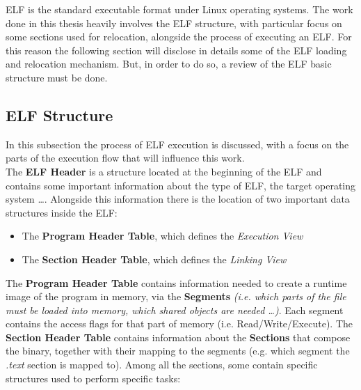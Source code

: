\gls{ELF} is the standard executable format under Linux operating systems.
The work done in this thesis heavily involves the \gls{ELF} structure, with particular focus on some sections 
used for relocation, alongside the process of executing an \gls{ELF}. For this reason the following section will disclose 
in details some of the \gls{ELF} loading and relocation mechanism. But, in order to do so, a review of the \gls{ELF} basic 
structure must be done.
\subsection{ELF Structure}
    In this subsection the process of \gls{ELF} execution is discussed, with a focus on the parts of the execution flow 
    that will influence this work.\\
    The \textbf{ELF Header} is a structure located at the beginning of the \gls{ELF} and contains some important information 
    about the type of \gls{ELF}, the target operating system \dots.
    Alongside this information there is the location of two important data structures inside the \gls{ELF}:
    \begin{itemize}
        \item The \textbf{Program Header Table}, which defines the \textit{Execution View}
        \item The \textbf{Section Header Table}, which defines the \textit{Linking View}
    \end{itemize}
    The \textbf{Program Header Table} contains information needed to create a runtime image of the program in memory, via 
    the \textbf{Segments} \textit{(i.e. which parts of the file must be loaded into memory, which shared 
    objects are needed \dots)}.
    Each segment contains the access flags for that part of memory (i.e. Read/Write/Execute).
    The \textbf{Section Header Table} contains information about the \textbf{Sections} that compose the binary, 
    together with their mapping to the segments (e.g. which segment the \textit{.text} section is mapped to).
    Among all the sections, some contain specific structures used to perform specific tasks:
